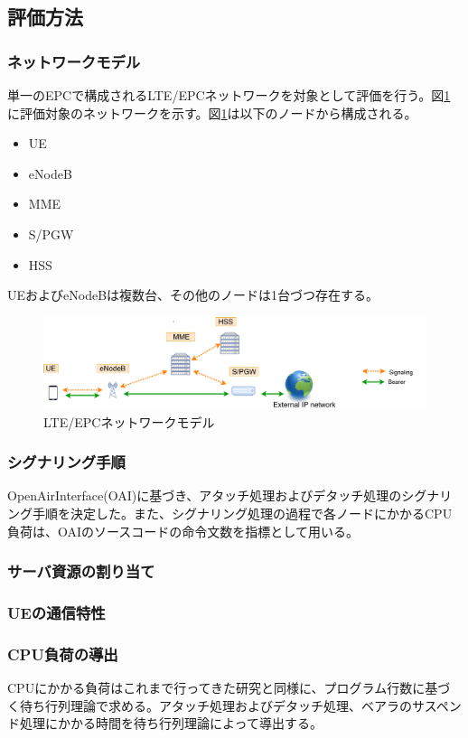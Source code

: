 \documentclass[a4j]{ujarticle}
\begin{document}
\subsection{評価方法}
\subsubsection{ネットワークモデル}
単一のEPCで構成されるLTE/EPCネットワークを対象として評価を行う。図\ref{networkmodel}に評価対象のネットワークを示す。図\ref{networkmodel}は以下のノードから構成される。
\begin{itemize}
  \item UE
  \item eNodeB
  \item MME
  \item S/PGW
	\item HSS
\end{itemize}
UEおよびeNodeBは複数台、その他のノードは1台づつ存在する。
\begin{figure}[htbp]
	\centering
	\includegraphics[width=0.7\hsize]{networkmodel.pdf}
  \caption{LTE/EPCネットワークモデル}
	\label{networkmodel}
\end{figure}
\subsubsection{シグナリング手順}
OpenAirInterface(OAI)\cite{OpenAirInterface}に基づき、アタッチ処理およびデタッチ処理のシグナリング手順を決定した。また、シグナリング処理の過程で各ノードにかかるCPU負荷は、OAIのソースコードの命令文数を指標として用いる。
\subsubsection{サーバ資源の割り当て}
\subsubsection{UEの通信特性}

\subsubsection{CPU負荷の導出}
CPUにかかる負荷はこれまで行ってきた研究と同様に、プログラム行数に基づく待ち行列理論で求める。アタッチ処理およびデタッチ処理、ベアラのサスペンド処理にかかる時間を待ち行列理論によって導出する。
\end{document}

